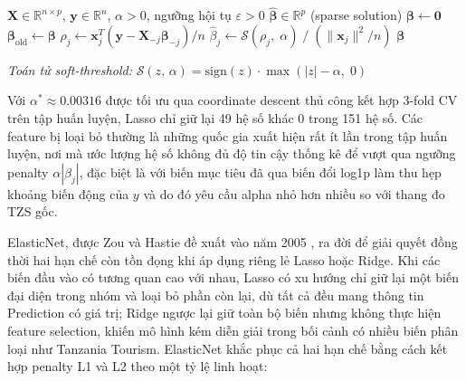 \begin{algorithm}[H]
\caption{Coordinate Descent cho Lasso}
\begin{algorithmic}[1]
\Require $\mathbf{X} \in \mathbb{R}^{n \times p}$,\; $\mathbf{y} \in \mathbb{R}^n$,\; $\alpha > 0$,\; ngưỡng hội tụ $\varepsilon > 0$
\Ensure $\hat{\boldsymbol{\beta}} \in \mathbb{R}^p$ (sparse solution)
\State $\boldsymbol{\beta} \leftarrow \mathbf{0}$ 
\Repeat
    \State $\boldsymbol{\beta}_{\text{old}} \leftarrow \boldsymbol{\beta}$
        \State $\rho_j \leftarrow \mathbf{x}_j^T\!\left(\mathbf{y} - \mathbf{X}_{-j}\boldsymbol{\beta}_{-j}\right) / n$ 
        \State $\hat{\beta}_j \leftarrow \mathcal{S}(\rho_j,\; \alpha) \;/\; \left(\|\mathbf{x}_j\|^2 / n\right)$ 
    \EndFor
{}
\State \Return $\boldsymbol{\beta}$
\end{algorithmic}
\end{algorithm}
\noindent\textit{Toán tử soft-threshold:}\; $\mathcal{S}(z,\,\alpha) = \mathrm{sign}(z)\cdot\max(|z| - \alpha,\;0)$

Với $\alpha^* \approx 0.00316$ được tối ưu qua coordinate descent thủ công kết hợp 3-fold CV trên tập huấn luyện, Lasso chỉ giữ lại 49 hệ số khác 0 trong 151 hệ số. Các feature bị loại bỏ thường là những quốc gia xuất hiện rất ít lần trong tập huấn luyện, nơi mà ước lượng hệ số không đủ độ tin cậy thống kê để vượt qua ngưỡng penalty $\alpha|\beta_j|$, đặc biệt là với biến mục tiêu đã qua biến đổi log1p làm thu hẹp khoảng biến động của $y$ và do đó yêu cầu alpha nhỏ hơn nhiều so với thang đo TZS gốc.


ElasticNet, được Zou và Hastie đề xuất vào năm 2005 \cite{zou2005}, ra đời để giải quyết đồng thời hai hạn chế còn tồn đọng khi áp dụng riêng lẻ Lasso hoặc Ridge. Khi các biến đầu vào có tương quan cao với nhau, Lasso có xu hướng chỉ giữ lại một biến đại diện trong nhóm và loại bỏ phần còn lại, dù tất cả đều mang thông tin Prediction có giá trị; Ridge ngược lại giữ toàn bộ biến nhưng không thực hiện feature selection, khiến mô hình kém diễn giải trong bối cảnh có nhiều biến phân loại như Tanzania Tourism. ElasticNet khắc phục cả hai hạn chế bằng cách kết hợp penalty L1 và L2 theo một tỷ lệ linh hoạt:

